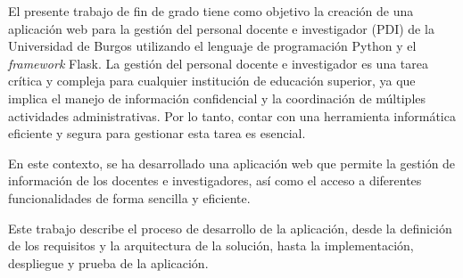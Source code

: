 
El presente trabajo de fin de grado tiene como objetivo la creación de una aplicación web para la gestión del personal docente e investigador (PDI) de la Universidad de Burgos utilizando el lenguaje de programación Python y el \textit{framework} Flask.
 La gestión del personal docente e investigador es una tarea crítica y compleja para cualquier institución de educación superior, ya que implica el manejo de información confidencial y la coordinación de múltiples actividades administrativas. 
Por lo tanto, contar con una herramienta informática eficiente y segura para gestionar esta tarea es esencial.

En este contexto, se ha desarrollado una aplicación web que permite la gestión de información de los docentes e investigadores, así como el acceso a diferentes funcionalidades de forma sencilla y eficiente. 

Este trabajo describe el proceso de desarrollo de la aplicación, desde la definición de los requisitos y la arquitectura de la solución, hasta la implementación, despliegue y prueba de la aplicación. 